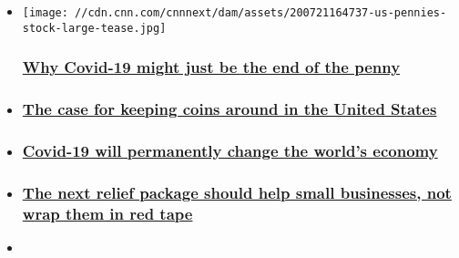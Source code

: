 \begin{itemize}
\item
  \href{/2020/07/22/perspectives/eliminating-penny-coin-shortage/index.html}{}

  \texttt{[image: //cdn.cnn.com/cnnnext/dam/assets/200721164737-us-pennies-stock-large-tease.jpg]}

  \hypertarget{why-covid-19-might-just-be-the-end-of-the-penny}{%
  \subsubsection{\texorpdfstring{\href{/2020/07/22/perspectives/eliminating-penny-coin-shortage/index.html}{Why
  Covid-19 might just be the end of the
  penny}}{Why Covid-19 might just be the end of the penny}}\label{why-covid-19-might-just-be-the-end-of-the-penny}}
\item
  \hypertarget{the-case-for-keeping-coins-around-in-the-united-states}{%
  \subsubsection{\texorpdfstring{\href{/2020/07/24/perspectives/keeping-coins-shortage/index.html}{The
  case for keeping coins around in the United
  States}}{The case for keeping coins around in the United States}}\label{the-case-for-keeping-coins-around-in-the-united-states}}
\item
  \hypertarget{covid-19-will-permanently-change-the-worlds-economy}{%
  \subsubsection{\texorpdfstring{\href{/2020/07/26/perspectives/sergio-rebelo-imf-covid-19-global-economy/index.html}{Covid-19
  will permanently change the world's
  economy}}{Covid-19 will permanently change the world's economy}}\label{covid-19-will-permanently-change-the-worlds-economy}}
\item
  \hypertarget{the-next-relief-package-should-help-small-businesses-not-wrap-them-in-red-tape}{%
  \subsubsection{\texorpdfstring{\href{/2020/07/27/perspectives/relief-package-small-business/index.html}{The
  next relief package should help small businesses, not wrap them in red
  tape}}{The next relief package should help small businesses, not wrap them in red tape}}\label{the-next-relief-package-should-help-small-businesses-not-wrap-them-in-red-tape}}
\item
  \hypertarget{forget-kanye-the-real-paycheck-protection-program-scandal-is-about-who-it-didnt-help}{%
}
\end{itemize}
